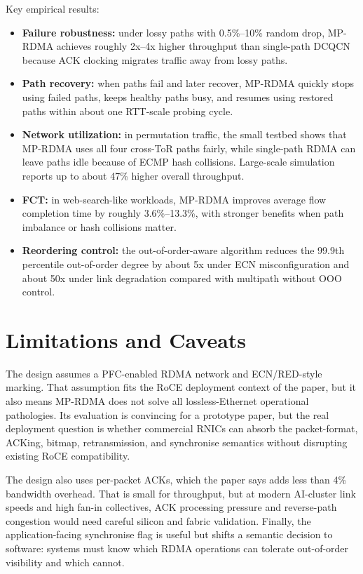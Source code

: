 \documentclass[10.5pt]{article}
\begin{document}
Key empirical results:
\begin{itemize}
  \item \textbf{Failure robustness:} under lossy paths with 0.5\%--10\% random drop, MP-RDMA achieves roughly 2x--4x higher throughput than single-path DCQCN because ACK clocking migrates traffic away from lossy paths.
  \item \textbf{Path recovery:} when paths fail and later recover, MP-RDMA quickly stops using failed paths, keeps healthy paths busy, and resumes using restored paths within about one RTT-scale probing cycle.
  \item \textbf{Network utilization:} in permutation traffic, the small testbed shows that MP-RDMA uses all four cross-ToR paths fairly, while single-path RDMA can leave paths idle because of ECMP hash collisions. Large-scale simulation reports up to about 47\% higher overall throughput.
  \item \textbf{FCT:} in web-search-like workloads, MP-RDMA improves average flow completion time by roughly 3.6\%--13.3\%, with stronger benefits when path imbalance or hash collisions matter.
  \item \textbf{Reordering control:} the out-of-order-aware algorithm reduces the 99.9th percentile out-of-order degree by about 5x under ECN misconfiguration and about 50x under link degradation compared with multipath without OOO control.
\end{itemize}

\section{Limitations and Caveats}
The design assumes a PFC-enabled RDMA network and ECN/RED-style marking. That assumption fits the RoCE deployment context of the paper, but it also means MP-RDMA does not solve all lossless-Ethernet operational pathologies. Its evaluation is convincing for a prototype paper, but the real deployment question is whether commercial RNICs can absorb the packet-format, ACKing, bitmap, retransmission, and synchronise semantics without disrupting existing RoCE compatibility.

The design also uses per-packet ACKs, which the paper says adds less than 4\% bandwidth overhead. That is small for throughput, but at modern AI-cluster link speeds and high fan-in collectives, ACK processing pressure and reverse-path congestion would need careful silicon and fabric validation. Finally, the application-facing synchronise flag is useful but shifts a semantic decision to software: systems must know which RDMA operations can tolerate out-of-order visibility and which cannot.
\end{document}
